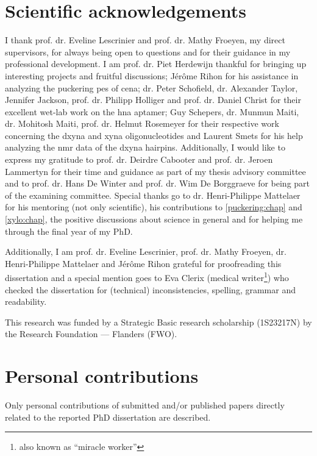 \section{Scientific acknowledgements}

I thank prof. dr. Eveline Lescrinier and prof. dr. Mathy Froeyen, my direct supervisors, for always being open to questions and for their guidance in my professional development. I am prof. dr. Piet Herdewijn thankful for bringing up interesting projects and fruitful discussions;  J\'er\^ome Rihon for his assistance in analyzing the puckering \gls{pes} of \gls{cena}; dr. Peter Schofield, dr. Alexander Taylor, Jennifer Jackson, prof. dr. Philipp Holliger and prof. dr. Daniel Christ for their excellent wet-lab work on the \gls{hna} aptamer; Guy Schepers, dr. Munmun Maiti, dr. Mohitosh Maiti, prof. dr. Helmut Rosemeyer for their respective work concerning the \gls{dxyna} and \gls{xyna} oligonucleotides and Laurent Smets for his help analyzing the \gls{nmr} data of the \gls{dxyna} hairpins. Additionally, I would like to express my gratitude to prof. dr. Deirdre Cabooter and prof. dr. Jeroen Lammertyn for their time and guidance as part of my thesis advisory committee and to prof. dr. Hans De Winter and prof. dr. Wim De Borggraeve for being part of the examining committee. Special thanks go to dr. Henri-Philippe Mattelaer for his mentoring (not only scientific), his contributions to \cref{puckering:chap} and \cref{xylo:chap}, the positive discussions about science in general and for helping me through the final year of my PhD. 

Additionally, I am prof. dr. Eveline Lescrinier, prof. dr. Mathy Froeyen, dr. Henri-Philippe Mattelaer and J\'er\^ome Rihon grateful for proofreading this dissertation and a special mention goes to Eva Clerix (medical writer\footnote{also known as ``miracle worker''}) who checked the dissertation for (technical) inconsistencies, spelling, grammar and readability. 

This research was funded by a Strategic Basic research scholarship (1S23217N) by the Research Foundation --- Flanders (FWO).

\section{Personal contributions}

Only personal contributions of submitted and/or published papers directly related to the reported PhD dissertation are described.

